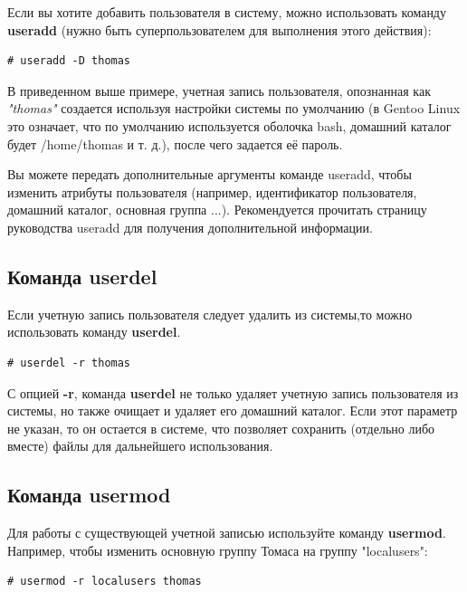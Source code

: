 \documentclass[10pt]{book}
\begin{document}
Если вы хотите добавить пользователя в систему, можно использовать команду \textbf{useradd} (нужно быть суперпользователем для выполнения этого действия):

\begin{tcolorbox}
\begin{lstlisting}
# useradd -D thomas
\end{lstlisting}
\end{tcolorbox}

В приведенном выше примере, учетная запись пользователя, опознанная как \textit{"thomas"} создается используя настройки системы по умолчанию (в Gentoo Linux это означает, что по умолчанию используется оболочка bash, домашний каталог будет /home/thomas и т. д.), после чего задается её пароль. 

Вы можете передать дополнительные аргументы команде useradd, чтобы изменить атрибуты пользователя (например, идентификатор пользователя, домашний каталог, основная группа ...). Рекомендуется прочитать страницу руководства useradd для получения дополнительной информации.

\subsection{Команда userdel}

Если учетную запись пользователя следует удалить из системы,то можно использовать команду \textbf{userdel}.

\begin{tcolorbox}
\begin{lstlisting}
# userdel -r thomas
\end{lstlisting}
\end{tcolorbox}

С опцией \textbf{-r}, команда \textbf{userdel} не только удаляет учетную запись пользователя из системы, но также очищает и удаляет его домашний каталог. Если этот параметр не указан, то он остается в системе, что позволяет сохранить (отдельно либо вместе) файлы для дальнейшего использования.

\subsection{Команда usermod}

Для работы с существующей учетной записью используйте команду \textbf{usermod}. Например, чтобы изменить основную группу Томаса на группу "localusers":

\begin{tcolorbox}
\begin{lstlisting}
# usermod -г localusers thomas
\end{lstlisting}
\end{tcolorbox}
\end{document}
